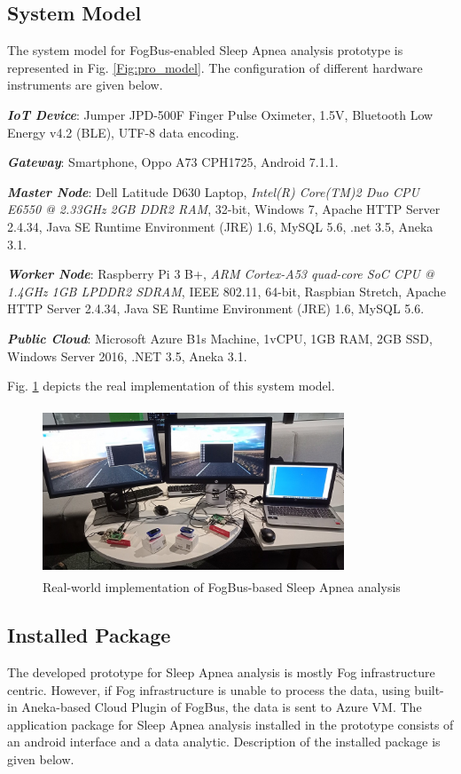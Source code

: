 \documentclass[final,5p,times,twocolumn]{elsarticle}
\begin{document}
\subsection{System Model} \label{model}
The system model for FogBus-enabled Sleep Apnea analysis prototype is represented in Fig. \ref{Fig:pro_model}. The configuration of different hardware instruments are given below.   
\par \textbf{\textit{IoT Device}}: Jumper JPD-500F Finger Pulse Oximeter, 1.5V, Bluetooth Low Energy v4.2 (BLE), UTF-8 data encoding. 
\par \textbf{\textit{Gateway}}: Smartphone, Oppo A73 CPH1725, Android 7.1.1. 
\par \textbf{\textit{Master Node}}: Dell Latitude D630 Laptop, \textit{Intel(R) Core(TM)2 Duo CPU
E6550 @ 2.33GHz 2GB DDR2 RAM}, 32-bit, Windows 7, Apache HTTP Server 2.4.34, Java SE Runtime Environment (JRE) 1.6, MySQL 5.6, .net 3.5, Aneka 3.1.   
\par \textbf{\textit{Worker Node}}: Raspberry Pi 3 B+, \textit{ARM Cortex-A53 quad-core SoC CPU @ 1.4GHz 1GB LPDDR2 SDRAM}, IEEE 802.11, 64-bit, Raspbian Stretch, Apache HTTP Server 2.4.34, Java SE Runtime Environment (JRE) 1.6, MySQL 5.6. 
\par \textbf{\textit{Public Cloud}}: Microsoft Azure B1s Machine, 1vCPU, 1GB RAM, 2GB SSD, Windows Server 2016, .NET 3.5, Aneka 3.1. 
\par Fig. \ref{Fig.real} depicts the real implementation of this system model.
%
\begin{figure}[!t]
\centering 
\includegraphics[width=90mm, height=50mm]{ProSystem.jpg}
\caption{Real-world implementation of FogBus-based Sleep Apnea analysis}
\label{Fig.real}
\end{figure}
%
\subsection{Installed Package}
The developed prototype for Sleep Apnea analysis is mostly Fog infrastructure centric. However, if Fog infrastructure is unable to process the data, using built-in Aneka-based Cloud Plugin of FogBus, the data is sent to Azure VM. The application package for Sleep Apnea analysis installed in the prototype consists of an android interface and a data analytic. Description of the installed package is given below.     
%
\end{document}
